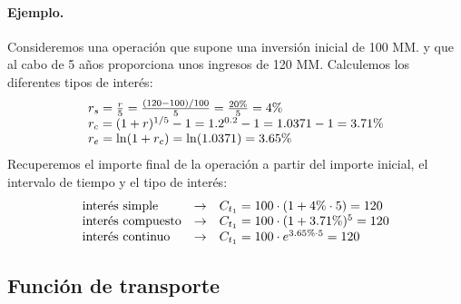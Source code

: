 \paragraph{Ejemplo.}
Consideremos una operaci\'on que supone una inversi\'on inicial de 100 MM. y que 
al cabo de 5 a\~{n}os proporciona unos ingresos de 120 MM. 
\newline
\newline
Calculemos los diferentes tipos de inter\'es:
\begin{displaymath}
\begin{array}{l}
r_s= \frac{r}{5} = \frac{(120-100)/100}{5} = \frac{20\%}{5} = 4\% \cr
r_c= (1+r) ^ {1/5} - 1 = 1.2^{0.2} - 1 = 1.0371 - 1 = 3.71 \%       \cr
r_e= \ln(1 + r_c) = \ln(1.0371) = 3.65 \%
\end{array}
\end{displaymath}
\newline
\newline
Recuperemos el importe final de la operaci\'on a partir del importe inicial, 
el intervalo de tiempo y el tipo de inter\'es:
\begin{displaymath}
\begin{array}{lcl}
\textrm{inter\'es simple}    & \rightarrow & C_{t_1} = 100 \cdot (1 + 4\% \cdot 5) = 120 \cr
\textrm{inter\'es compuesto} & \rightarrow & C_{t_1} = 100 \cdot (1 + 3.71\%)^5 = 120 \cr
\textrm{inter\'es continuo}  & \rightarrow & C_{t_1} = 100 \cdot e^{3.65 \% \cdot 5} = 120
\end{array}
\end{displaymath}

\subsection{Funci\'on de transporte}

